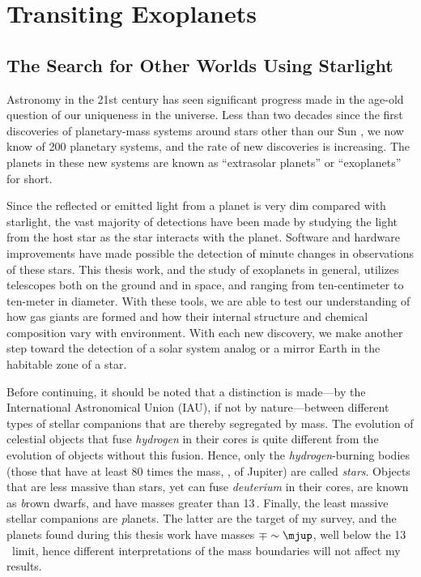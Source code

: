 \chapter[Transiting Exoplanets]%
{%
Transiting Exoplanets}\label{cha:intro}

\section{The Search for Other Worlds Using Starlight}\label{cha:intro:sec:search}

Astronomy in the 21st century has seen significant progress made in the age-old question of our uniqueness in the universe.
Less than two decades since the first discoveries of planetary-mass systems around stars other than our Sun \citep{Latham_Stefanik_Mazeh:nat:1989a, Wolszczan_Frail:nat:1992a, Mayor_Queloz:nat:1995a}, we now know of 200 planetary systems, and the rate of new discoveries is increasing.
The planets in these new systems are known as ``extrasolar planets'' or ``exoplanets'' for short.

Since the reflected or emitted light from a planet is very dim compared with starlight, the vast majority of detections have been made by studying the light from the host star as the star interacts with the planet.
Software and hardware improvements have made possible the detection of minute changes in observations of these stars.
This thesis work, and the study of exoplanets in general, utilizes telescopes both on the ground and in space, and ranging from ten-centimeter to ten-meter in diameter.
With these tools, we are able to test our understanding of how gas giants are formed and how their internal structure and chemical composition vary with environment.
With each new discovery, we make another step toward the detection of a solar system analog or a mirror Earth in the habitable zone of a star.

Before continuing, it should be noted that a distinction is made---by the International Astronomical Union (IAU), if not by nature---between different types of stellar companions that are thereby segregated by mass.
The evolution of celestial objects that fuse \textit{hydrogen} in their cores is quite different from the evolution of objects without this fusion.
Hence, only the \textit{hydrogen}-burning bodies (those that have at least 80 times the mass, \mjup, of Jupiter) are called \textit{stars}.
Objects that are less massive than stars, yet can fuse \textit{deuterium} in their cores, are known as {\textit brown dwarfs}, and have masses greater than 13\,\mjup.
Finally, the least massive stellar companions are {\textit planets}.
The latter are the target of my survey, and the planets found during this thesis work have masses $\mp\sim\mjup$, well below the 13\,\mjup\ limit, hence different interpretations of the mass boundaries will not affect my results.


